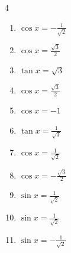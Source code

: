 \begin{multicols}{4}
\begin{enumerate}
\columnbreak %

  \item $\displaystyle \cos{x}  = -\frac{1}{\sqrt{2}}$


  \item $\displaystyle \cos{x}  = \frac{\sqrt{3}}{2}$


  \item $\displaystyle \tan{x}  = \sqrt{3}$


  \item $\displaystyle \cos{x}  = \frac{\sqrt{3}}{2}$


  \item $\displaystyle \cos{x}  = -1$

        \phantom{$\displaystyle x = \pi$}

  \item $\displaystyle \tan{x}  = \frac{1}{\sqrt{3}}$


  \item $\displaystyle \cos{x}  = \frac{1}{\sqrt{2}}$


  \item $\displaystyle \cos{x}  = -\frac{\sqrt{3}}{2}$


  \item $\displaystyle \sin{x}  = \frac{1}{\sqrt{2}}$


  \item $\displaystyle \sin{x}  = \frac{1}{\sqrt{2}}$


  \item $\displaystyle \sin{x}  = -\frac{1}{\sqrt{2}}$



\end{enumerate}
\end{multicols}
